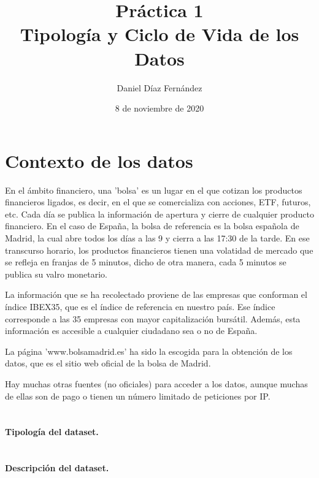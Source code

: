 \documentclass[12pt]{article}
\title{%
Práctica 1\\
\large Tipología y Ciclo de Vida de los Datos}
\author{Daniel Díaz Fernández}
\date{8 de noviembre de 2020}
\begin{document}
\maketitle

\section*{Contexto de los datos}
En el ámbito financiero, una 'bolsa' es un lugar en el que cotizan los productos financieros ligados, es decir, en el que se comercializa con acciones, ETF, futuros, etc. Cada día se publica la información de apertura y cierre de cualquier producto financiero. En el caso de España, la bolsa de referencia es la bolsa española de Madrid, la cual abre todos los días a las 9 y cierra a las 17:30 de la tarde. En ese transcurso horario, los productos financieros tienen una volatidad de mercado que se refleja en franjas de 5 minutos, dicho de otra manera, cada 5 minutos se publica su valro monetario.

La información que se ha recolectado proviene de las empresas que conforman el índice IBEX35, que es el índice de referencia en nuestro país. Ese índice corresponde a las 35 empresas con mayor capitalización bursátil. Además, esta información es accesible a cualquier ciudadano sea o no de España.

La página 'www.bolsamadrid.es' ha sido la escogida para la obtención de los datos, que es el sitio web oficial de la bolsa de Madrid.

Hay muchas otras fuentes (no oficiales) para acceder a los datos, aunque muchas de ellas son de pago o tienen un número limitado de peticiones por IP.

\section*{}
\paragraph{Tipología del dataset.\\}


\section*{}
\paragraph{Descripción del dataset.\\}
\end{document}
